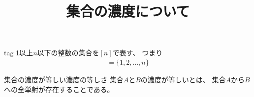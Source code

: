 \documentclass[a4paper, 10pt]{jsarticle}
\title{集合の濃度について}
\author{}
\begin{document}
\maketitle

\begin{dfn}{}{tag}
	1以上$n$以下の整数の集合を$[n]$で表す、
	つまり
	\begin{align}
		[n] = \{ 1, 2, \dots, n \}
	\end{align}
\end{dfn}

\begin{dfn}{集合の濃度が等しい}{濃度の等しさ}
	集合$A$と$B$の濃度が等しいとは、
	集合$A$から$B$への全単射が存在することである。
\end{dfn}
\end{document}

